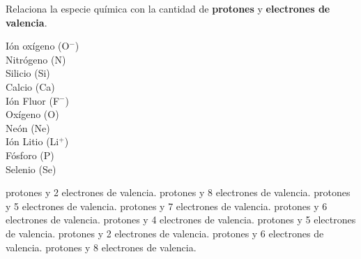 Relaciona la especie química con la cantidad de \textbf{protones} y \textbf{electrones de valencia}.\\

\begin{minipage}[t][][t]{0.4\textwidth}
    \begin{choices}
        \choice Ión oxígeno (O$^{-}$)       \\[-0.5em]
        \choice Nitrógeno (N)               \\[-0.5em]
        \choice Silicio (Si)                \\[-0.5em]
        \choice Calcio (Ca)                 \\[-0.5em]
        \choice Ión Fluor (F$^-$)           \\[-0.5em]
        \choice Oxígeno (O)                 \\[-0.5em]
        \choice Neón (Ne)                   \\[-0.5em]
        \choice Ión Litio (Li$^+$)          \\[-0.5em]
        \choice Fósforo (P)                 \\[-0.5em]
        \choice Selenio (Se)                \\[-0.5em]
    \end{choices}
\end{minipage}\hfill
\begin{minipage}[t][][t]{0.6\textwidth}
    \begin{parts}
         protones y 2 electrones de valencia.
         protones y 8 electrones de valencia.
         protones y 5 electrones de valencia.
         protones y 7 electrones de valencia.
         protones y 6 electrones de valencia.
         protones y 4 electrones de valencia.
         protones y 5 electrones de valencia.
         protones y 2 electrones de valencia.
         protones y 6 electrones de valencia.
         protones y 8 electrones de valencia.
    \end{parts}
\end{minipage}
